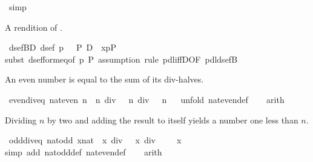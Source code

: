 \begin{isabellebody}
\ simp\isanewline
\ \ \isamarkupfalse%
\isanewline
\isamarkupfalse%
\isamarkupfalse%
%
\begin{isamarkuptext}%
A rendition of .%
\end{isamarkuptext}%
\isamarkuptrue%
\ dsefB{\isacharunderscore}D{\isacharcolon}\ {\isachardoublequote}dsef\ p\ {\isasymLongrightarrow}\ {\isasymturnstile}\ P\ {\isasymlongrightarrow}\isactrlsub D\ {\isacharbrackleft}{\isacharhash}\ x{\isasymleftarrow}p{\isacharbrackright}P{\isachardoublequote}\isanewline
\isamarkupfalse%
subst\ dsef{\isacharunderscore}form{\isacharunderscore}eq{\isacharbrackleft}of\ p\ P{\isacharbrackright}{\isacharcomma}\ assumption{\isacharcomma}\ rule\ pdl{\isacharunderscore}iffD{}{\isacharbrackleft}OF\ pdl{\isacharunderscore}dsefB{\isacharbrackright}{\isacharparenright}\isamarkupfalse%
%
\begin{isamarkuptext}%
An even number is equal to the sum of its div-halves.%
\end{isamarkuptext}%
\isamarkuptrue%
\ even{\isacharunderscore}div{\isacharunderscore}eq{\isacharcolon}\ {\isachardoublequote}nat{\isacharunderscore}even\ n\ {\isacharequal}\ {\isacharparenleft}n\ div\ {}\ {\isacharplus}\ n\ div\ {}\ {\isacharequal}\ n{\isacharparenright}{\isachardoublequote}\isanewline
\ \ \isamarkupfalse%
unfold\ nat{\isacharunderscore}even{\isacharunderscore}def{\isacharparenright}\isanewline
\ \ \isamarkupfalse%
\ arith\isamarkupfalse%
%
\begin{isamarkuptext}%
Dividing $n$ by two and adding the result to itself yields a number one less
  than $n$.%
\end{isamarkuptext}%
\isamarkuptrue%
\ odd{\isacharunderscore}div{\isacharunderscore}eq{\isacharcolon}\ {\isachardoublequote}nat{\isacharunderscore}odd\ {\isacharparenleft}x{\isacharcolon}{\isacharcolon}nat{\isacharparenright}\ {\isacharequal}\ {\isacharparenleft}x\ div\ {}\ {\isacharplus}\ x\ div\ {}\ {\isacharplus}\ {}\ {\isacharequal}\ x{\isacharparenright}{\isachardoublequote}\isanewline
\ \ \isamarkupfalse%
simp\ add{\isacharcolon}\ nat{\isacharunderscore}odd{\isacharunderscore}def\ nat{\isacharunderscore}even{\isacharunderscore}def{\isacharparenright}\isanewline
\ \ \isamarkupfalse%
\ {\isacharparenleft}arith{\isacharparenright}\isamarkupfalse%

\end{isabellebody}
